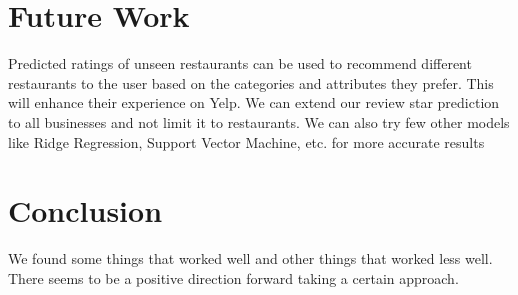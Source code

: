\documentclass[12pt]{article}
\begin{document}
\section{Future Work}

Predicted ratings of unseen restaurants can be used to recommend different restaurants to the user based 
on the categories and attributes they prefer. This will enhance their experience on Yelp. 
We can extend our review star prediction to all businesses and not limit it to restaurants. 
We can also try few other models like Ridge Regression, Support Vector Machine, etc. for more accurate results

\section{Conclusion}

We found some things that worked well and other things that worked
less well. There seems to be a positive direction forward taking a
certain approach.


 

\end{document}
